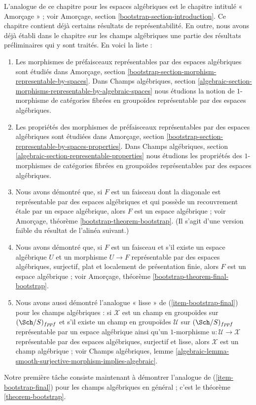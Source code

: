 \noindent
L'analogue de ce chapitre pour les espaces algébriques est le chapitre intitulé
« Amorçage » ; voir
Amorçage, section \ref{bootstrap-section-introduction}.
Ce chapitre contient déjà certains résultats de représentabilité.
En outre, nous avons déjà établi dans le chapitre sur les champs algébriques
une partie des résultats préliminaires qui y sont traités.
En voici la liste :
\begin{enumerate}
\item Les morphismes de préfaisceaux représentables par des espaces algébriques sont étudiés dans
Amorçage, section
\ref{bootstrap-section-morphism-representable-by-spaces}.
Dans
Champs algébriques, section
\ref{algebraic-section-morphisms-representable-by-algebraic-spaces}
nous étudions la notion de $1$-morphisme de catégories fibrées en groupoïdes
représentable par des espaces algébriques.
\item Les propriétés des morphismes de préfaisceaux représentables par des
espaces algébriques sont étudiées dans
Amorçage, section
\ref{bootstrap-section-representable-by-spaces-properties}.
Dans
Champs algébriques, section
\ref{algebraic-section-representable-properties}
nous étudions les propriétés des $1$-morphismes de catégories fibrées en groupoïdes
représentables par des espaces algébriques.
\item Nous avons démontré que, si $F$ est un faisceau dont la diagonale est représentable
par des espaces algébriques et qui possède un recouvrement \'etale par un espace
algébrique, alors $F$ est un espace algébrique ; voir
Amorçage, théorème \ref{bootstrap-theorem-bootstrap}.
(Il s'agit d'une version faible du résultat de l'alinéa suivant.)
\item
\label{item-bootstrap-final}
Nous avons démontré que, si $F$ est un faisceau et s'il existe un espace
algébrique $U$ et un morphisme $U \to F$ représentable par des espaces
algébriques, surjectif, plat et localement de présentation finie, alors
$F$ est un espace algébrique ; voir
Amorçage, théorème \ref{bootstrap-theorem-final-bootstrap}.
\item Nous avons aussi démontré l'analogue « lisse » de
(\ref{item-bootstrap-final}) pour les champs
algébriques : si $\mathcal{X}$ est un champ en groupoïdes sur
$(\Sch/S)_{fppf}$ et s'il existe un champ en groupoïdes
$\mathcal{U}$ sur $(\Sch/S)_{fppf}$ représentable
par un espace algébrique ainsi qu'un $1$-morphisme $u : \mathcal{U} \to \mathcal{X}$
représentable par des espaces algébriques, surjectif et lisse,
alors $\mathcal{X}$ est un champ algébrique ; voir
Champs algébriques, lemme
\ref{algebraic-lemma-smooth-surjective-morphism-implies-algebraic}.
\end{enumerate}
Notre première tâche consiste maintenant à démontrer l'analogue de
(\ref{item-bootstrap-final}) pour les champs
algébriques en général ; c'est le
théorème \ref{theorem-bootstrap}.



